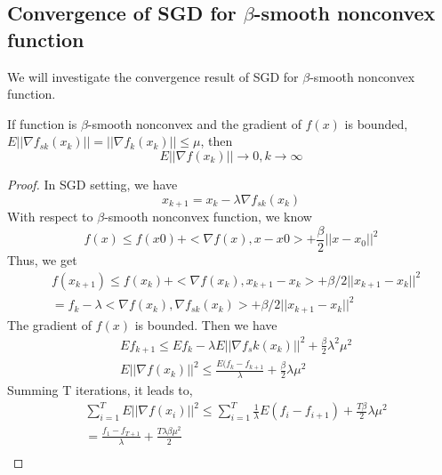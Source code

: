 \documentclass[12pt]{report}
\begin{document}
\subsection{Convergence of SGD for $\beta$-smooth nonconvex function}
We will investigate the convergence result of SGD for $\beta$-smooth nonconvex function.
\begin{theorem}
	\label{Thm::GD}
	If function is $\beta$-smooth nonconvex and the gradient of $f(x)$ is bounded, $E||\nabla f_{sk}(x_k)|| = ||\nabla f_k(x_k)|| \leq \mu$, then 
	\begin{equation} \label{sgd::convg}
	E||\nabla f(x_k)|| \rightarrow 0, k \rightarrow \infty
	\end{equation}\cite{ghadimi2013stochastic}
\end{theorem}
\begin{proof}
	In SGD setting, we have
	\begin{equation*}
	x_{k + 1} = x_k - \lambda\nabla f_{sk}(x_k)	
	\end{equation*}
	With respect to $\beta$-smooth nonconvex function, we know
	\begin{equation*}
	f(x) \leq f(x0) + <\nabla f(x), x - x0> + \frac{\beta}{2}||x - x_0||^2
	\end{equation*}
	Thus, we get 
	\begin{equation*}
	\begin{split}
	& f(x_{k + 1}) \leq f(x_k) + <\nabla f(x_k), x_{k + 1} - x_k> + \beta / 2 || x_{k + 1} - x_k||^2 \\
	& = f_k - \lambda<\nabla f(x_k), \nabla f_{sk}(x_k)> + \beta / 2 ||x_{k + 1} - x_k||^2
	\end{split}
	\end{equation*}
	The gradient of $f(x)$ is bounded. Then we have 
	\begin{equation*}
	\begin{split}
	& Ef_{k + 1} \leq Ef_{k} - \lambda E||\nabla f_sk(x_k)||^2 + \frac{\beta}{2}\lambda^2\mu^2 \\
	& E||\nabla f(x_k)||^2 \leq \frac{E(f_k - f_{k + 1}}{\lambda} + \frac{\beta}{2}\lambda\mu^2
	\end{split}
	\end{equation*}
	Summing T iterations, it leads to,
	\begin{equation*}
	\begin{split}
	& \sum_{i = 1}^{T}E||\nabla f(x_i)||^2 \leq \sum_{i = 1}^{T}\frac{1}{\lambda}E(f_i - f_{i + 1}) + \frac{T\beta}{2}\lambda\mu^2 \\
	& = \frac{f_1 - f_{T + 1}}{\lambda} + \frac{T\lambda\beta\mu^2}{2} \\

\end{split}
\end{equation*}
\end{proof}
\end{document}
